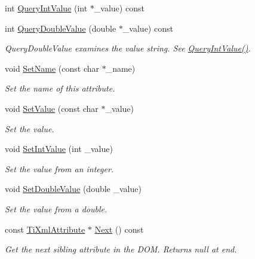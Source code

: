 \begin{DoxyCompactItemize}
\item 
int \hyperlink{class_ti_xml_attribute_ad6c93088ee21af41a107931223339344}{Query\+Int\+Value} (int $\ast$\+\_\+value) const 
\item 
int \hyperlink{class_ti_xml_attribute_ac87b2a8489906a5d7aa2875f20be3513}{Query\+Double\+Value} (double $\ast$\+\_\+value) const 
\begin{DoxyCompactList}\small\item\em Query\+Double\+Value examines the value string. See \hyperlink{class_ti_xml_attribute_ad6c93088ee21af41a107931223339344}{Query\+Int\+Value()}. \end{DoxyCompactList}\item 
void \hyperlink{class_ti_xml_attribute_ab7fa3d21ff8d7c5764cf9af15b667a99}{Set\+Name} (const char $\ast$\+\_\+name)
\begin{DoxyCompactList}\small\item\em Set the name of this attribute. \end{DoxyCompactList}\item 
void \hyperlink{class_ti_xml_attribute_a2dae44178f668b3cb48101be4f2236a0}{Set\+Value} (const char $\ast$\+\_\+value)
\begin{DoxyCompactList}\small\item\em Set the value. \end{DoxyCompactList}\item 
void \hyperlink{class_ti_xml_attribute_a7e065df640116a62ea4f4b7da5449cc8}{Set\+Int\+Value} (int \+\_\+value)
\begin{DoxyCompactList}\small\item\em Set the value from an integer. \end{DoxyCompactList}\item 
void \hyperlink{class_ti_xml_attribute_a0316da31373496c4368ad549bf711394}{Set\+Double\+Value} (double \+\_\+value)
\begin{DoxyCompactList}\small\item\em Set the value from a double. \end{DoxyCompactList}\item 
const \hyperlink{class_ti_xml_attribute}{Ti\+Xml\+Attribute} $\ast$ \hyperlink{class_ti_xml_attribute_a776478980776a024f7c2846eec640f65}{Next} () const 
\begin{DoxyCompactList}\small\item\em Get the next sibling attribute in the D\+OM. Returns null at end. \end{DoxyCompactList}\item 

\end{DoxyCompactItemize}
